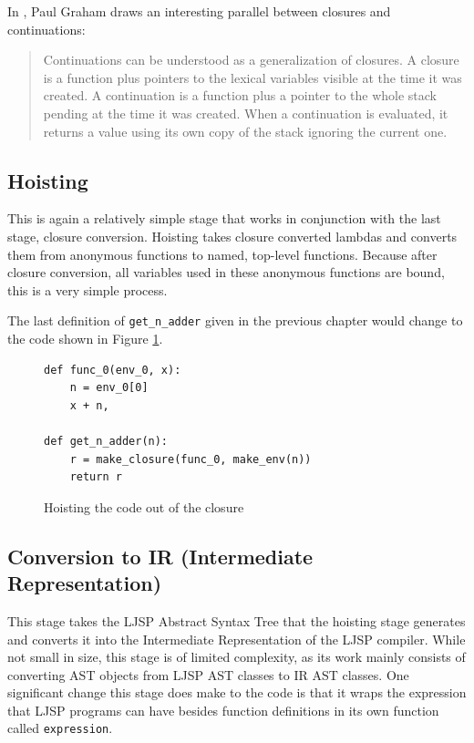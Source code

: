 \documentclass[11pt]{report}
\begin{document}
In \cite{onlisp}, Paul Graham draws an interesting parallel between closures and continuations:
\begin{quote}
Continuations can be understood as a generalization of closures. A closure is a function plus pointers to the lexical variables visible at the time it was created. A continuation is a function plus a pointer to the whole stack pending at the time it was created. When a continuation is evaluated, it returns a value using its own copy of the stack ignoring the current one.
\end{quote}



\subsection{Hoisting}
This is again a relatively simple stage that works in conjunction with the last stage, closure conversion. Hoisting takes closure converted lambdas and converts them from anonymous functions to named, top-level functions. Because after closure conversion, all variables used in these anonymous functions are bound, this is a very simple process.

The last definition of \texttt{get_n_adder} given in the previous chapter would change to the code shown in Figure \ref{hoisting}.

\begin{figure}[ht]
\begin{lstlisting}
def func_0(env_0, x):
    n = env_0[0]
    x + n, 
    
def get_n_adder(n):
    r = make_closure(func_0, make_env(n))
    return r
\end{lstlisting}
\caption{Hoisting the code out of the closure}
\label{hoisting}
\end{figure}

\subsection{Conversion to IR (Intermediate Representation)}
This stage takes the LJSP Abstract Syntax Tree that the hoisting stage generates and converts it into the Intermediate Representation of the LJSP compiler. While not small in size, this stage is of limited complexity, as its work mainly consists of converting AST objects from LJSP AST classes to IR AST classes. One significant change this stage does make to the code is that it wraps the expression that LJSP programs can have besides function definitions in its own function called \texttt{expression}.
\end{document}
